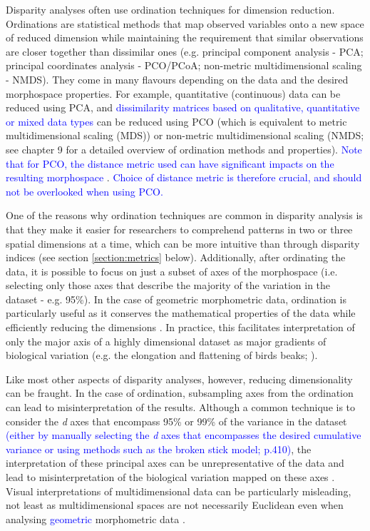 \documentclass[12pt,letterpaper]{article}
\begin{document}
Disparity analyses often use ordination techniques for dimension reduction.
Ordinations are statistical methods that map observed variables onto a new space of reduced dimension while maintaining the requirement that similar observations are closer together than dissimilar ones (e.g. principal component analysis - PCA; principal coordinates analysis - PCO/PCoA; non-metric multidimensional scaling - NMDS).
They come in many flavours depending on the data and the desired morphospace properties.
For example, quantitative (continuous) data can be reduced using PCA, and \textcolor{blue}{dissimilarity matrices based on qualitative, quantitative or mixed data types} can be reduced using PCO (which is equivalent to metric multidimensional scaling (MDS)) or non-metric multidimensional scaling (NMDS; see \citealt{Legendre2012} chapter 9 for a detailed overview of ordination methods and properties).
\textcolor{blue}{Note that for PCO, the distance metric used can have significant impacts on the resulting morphospace} \citep{lehmann2019}. 
\textcolor{blue}{Choice of distance metric is therefore crucial, and should not be overlooked when using PCO.}

One of the reasons why ordination techniques are common in disparity analysis is that they make it easier for researchers to comprehend patterns in two or three spatial dimensions at a time, which can be more intuitive than through disparity indices (see section \ref{section:metrics} below).
Additionally, after ordinating the data, it is possible to focus on just a subset of axes of the morphospace (i.e.
selecting only those axes that describe the majority of the variation in the dataset - e.g. 95\%).
In the case of geometric morphometric data, ordination is particularly useful as it conserves the mathematical properties of the data while efficiently reducing the dimensions \citep{Legendre2012,dryden2016statistical}.
In practice, this facilitates interpretation of only the major axis of a highly dimensional dataset as major gradients of biological variation (e.g. the elongation and flattening of birds beaks; \citealt{bright2016shapes}).

Like most other aspects of disparity analyses, however, reducing dimensionality can be fraught.
In the case of ordination, subsampling axes from the ordination can lead to misinterpretation of the results.
Although a common technique is to consider the \textit{d} axes that encompass 95\% or 99\% of the variance in the dataset \textcolor{blue}{(either by manually selecting the \textit{d} axes that encompasses the desired cumulative variance or using methods such as the broken stick model; \citealt{Legendre2012} p.410)}, the interpretation of these principal axes can be unrepresentative of the data and lead to misinterpretation of the biological variation mapped on these axes \citep{Bookstein2015, Weisbecker2019}.
Visual interpretations of multidimensional data can be particularly misleading, not least as multidimensional spaces are not necessarily Euclidean even when analysing \textcolor{blue}{geometric} morphometric data \citep{Deline2018, Gerber2017}.
\end{document}
